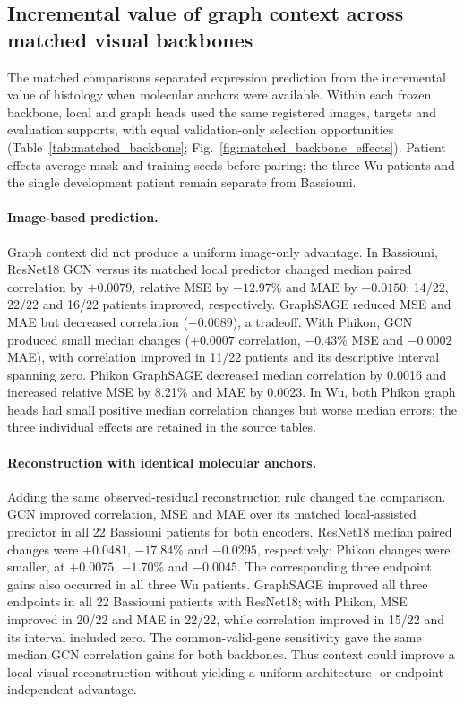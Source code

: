 \subsection{Incremental value of graph context across matched visual backbones}
The matched comparisons separated expression prediction from the incremental value of histology when molecular anchors were available. Within each frozen backbone, local and graph heads used the same registered images, targets and evaluation supports, with equal validation-only selection opportunities (Table~\ref{tab:matched_backbone}; Fig.~\ref{fig:matched_backbone_effects}). Patient effects average mask and training seeds before pairing; the three Wu patients and the single development patient remain separate from Bassiouni.

\paragraph{Image-based prediction.}
Graph context did not produce a uniform image-only advantage. In Bassiouni, ResNet18 GCN versus its matched local predictor changed median paired correlation by $+0.0079$, relative MSE by $-12.97$\% and MAE by $-0.0150$; 14/22, 22/22 and 16/22 patients improved, respectively. GraphSAGE reduced MSE and MAE but decreased correlation ($-0.0089$), a tradeoff. With Phikon, GCN produced small median changes ($+0.0007$ correlation, $-0.43$\% MSE and $-0.0002$ MAE), with correlation improved in 11/22 patients and its descriptive interval spanning zero. Phikon GraphSAGE decreased median correlation by 0.0016 and increased relative MSE by 8.21\% and MAE by 0.0023. In Wu, both Phikon graph heads had small positive median correlation changes but worse median errors; the three individual effects are retained in the source tables.

\paragraph{Reconstruction with identical molecular anchors.}
Adding the same observed-residual reconstruction rule changed the comparison. GCN improved correlation, MSE and MAE over its matched local-assisted predictor in all 22 Bassiouni patients for both encoders. ResNet18 median paired changes were $+0.0481$, $-17.84$\% and $-0.0295$, respectively; Phikon changes were smaller, at $+0.0075$, $-1.70$\% and $-0.0045$. The corresponding three endpoint gains also occurred in all three Wu patients. GraphSAGE improved all three endpoints in all 22 Bassiouni patients with ResNet18; with Phikon, MSE improved in 20/22 and MAE in 22/22, while correlation improved in 15/22 and its interval included zero. The common-valid-gene sensitivity gave the same median GCN correlation gains for both backbones. Thus context could improve a local visual reconstruction without yielding a uniform architecture- or endpoint-independent advantage.

